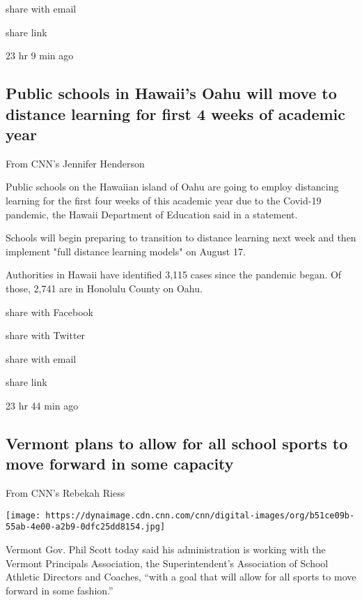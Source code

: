 share with email

share link

23 hr 9 min ago

\hypertarget{public-schools-in-hawaiis-oahu-will-move-to-distance-learning-for-first-4-weeks-of-academic-year}{%
\subsection{Public schools in Hawaii's Oahu will move to distance
learning for first 4 weeks of academic
year}\label{public-schools-in-hawaiis-oahu-will-move-to-distance-learning-for-first-4-weeks-of-academic-year}}

From CNN's Jennifer Henderson

Public schools on the Hawaiian island of Oahu are going to employ
distancing learning for the first four weeks of this academic year due
to the Covid-19 pandemic, the Hawaii Department of Education said in a
statement.

Schools will begin preparing to transition to distance learning next
week and then implement "full distance learning models" on August 17.

Authorities in Hawaii have identified 3,115 cases since the pandemic
began. Of those, 2,741 are in Honolulu County on Oahu.

share with Facebook

share with Twitter

share with email

share link

23 hr 44 min ago

\hypertarget{vermont-plans-to-allow-for-all-school-sports-to-move-forward-in-some-capacity}{%
\subsection{Vermont plans to allow for all school sports to move forward
in some
capacity}\label{vermont-plans-to-allow-for-all-school-sports-to-move-forward-in-some-capacity}}

From CNN's Rebekah Riess

\texttt{[image: https://dynaimage.cdn.cnn.com/cnn/digital-images/org/b51ce09b-55ab-4e00-a2b9-0dfc25dd8154.jpg]}

Vermont Gov. Phil Scott today said his administration is working with
the Vermont Principals Association, the Superintendent's Association of
School Athletic Directors and Coaches, ``with a goal that will allow for
all sports to move forward in some fashion.''

